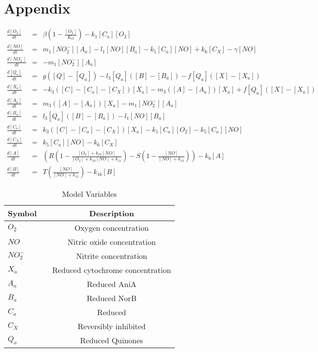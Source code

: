\appendix
\chapter{Appendix}
\begin{eqnarray}
\frac{d[O_2]}{dt} & = & \beta\left(1-\frac{[O_2]}{K_O}\right) - k_{1}[C_a][O_2] \nonumber \\
\frac{d[NO]}{dt} & = & m_{1}[NO_2^-][A_a] - l_1[NO][B_a] - k_5[C_a][NO] + k_6[C_X] - \gamma[NO] \nonumber \\
\frac{d[NO_2^-]}{dt} & = & - m_{1}[NO_2^-][A_a] \nonumber \\
\frac{d[Q_a]}{dt} & = & g([Q] - [Q_a]) - l_3[Q_a]([B] - [B_a]) - f[Q_a]([X]-[X_a])\ \nonumber \\
\frac{d[X_a]}{dt} & = & -k_3([C] - [C_a] - [C_X])[X_a] - m_3([A] - [A_a])[X_a] + f[Q_a]([X]-[X_a]) \nonumber \\
\frac{d[A_a]}{dt} & = & m_3([A] - [A_a])[X_a] - m_{1}[NO_2^-][A_a] \nonumber \\
\frac{d[B_a]}{dt} & = & l_3[Q_a]([B] - [B_a]) - l_1[NO][B_a] \nonumber \\
\frac{d[C_a]}{dt} & = & k_3([C] - [C_a] - [C_X])[X_a] - k_{1}[C_a][O_2] - k_{5}[C_a][NO] \nonumber \\
\frac{d[C_X]}{dt} & = & k_5[C_a][NO] - k_6 [C_X] \nonumber \\
\frac{d[A]}{dt} & = & \left(R\left(1 - \frac{[O_2] + k_{10}[NO]}{[O_2] + k_{10}[NO] + k_{11}}\right) - S\left(1 - \frac{[NO]}{[NO] + k_{13}}\right)\right) - k_8[A] \nonumber \\
\frac{d[B]}{dt} & = & T \left(\frac{[NO]}{[NO] + k_{15}}\right) - k_{16}[B]
\end{eqnarray}

\begin{table}[ht]
\begin{center}
\begin{tabular}{lcc}
\toprule
\textbf{Symbol} & & \textbf{Description}\\
\midrule
$O_2$ & & Oxygen concentration\\
$NO$ & & Nitric oxide concentration\\
$NO_2^-$ & & Nitrite concentration\\
$X_a$ & & Reduced cytochrome concentration\\
$A_a$& & Reduced AniA\\
$B_a$& & Reduced NorB\\
$C_a$& & Reduced \cbbthree{}\\
$C_X$& & Reversibly inhibited \cbbthree{}\\
$Q_a$& & Reduced Quinones\\
\bottomrule
\end{tabular}
\caption{Model Variables
\label{vs}}
\end{center}
\end{table}



